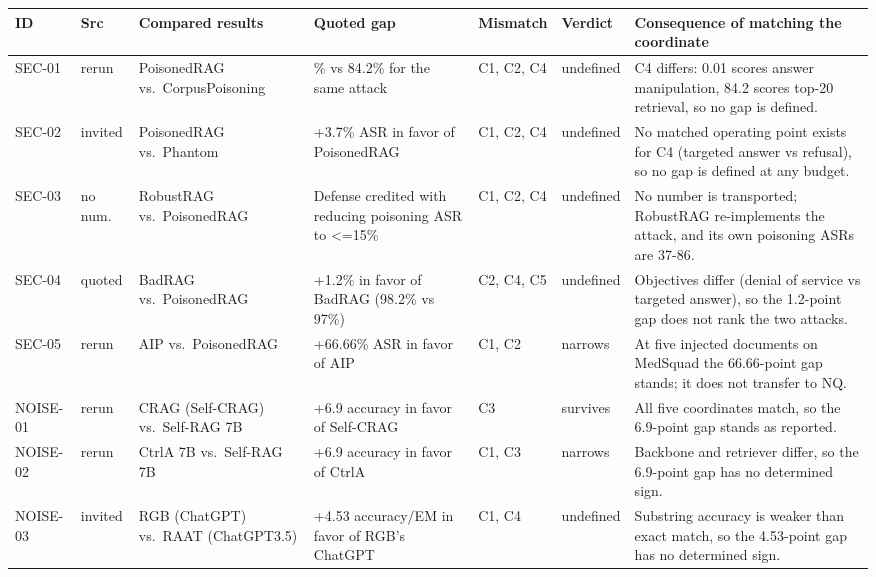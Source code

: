 \begin{table}[t]
\centering\scriptsize
\setlength{\tabcolsep}{2pt}
\begin{tabular}{@{}>{\raggedright\arraybackslash}p{}>{\raggedright\arraybackslash}p{}>{\raggedright\arraybackslash}p{}>{\raggedright\arraybackslash}p{}>{\raggedright\arraybackslash}p{}>{\raggedright\arraybackslash}p{}>{\raggedright\arraybackslash}p{}@{}}
\toprule
ID & Src & Compared results & Quoted gap & Mismatch & Verdict & Consequence of matching the coordinate \\
\midrule
SEC-01 & rerun & PoisonedRAG vs.~CorpusPoisoning & 1\% vs 84.2\% for the same attack & C1, C2, C4 & undefined & C4 differs: 0.01 scores answer manipulation, 84.2 scores top-20 retrieval, so no gap is defined. \\
SEC-02 & invited & PoisonedRAG vs.~Phantom & +3.7\% ASR in favor of PoisonedRAG & C1, C2, C4 & undefined & No matched operating point exists for C4 (targeted answer vs refusal), so no gap is defined at any budget. \\
SEC-03 & no num. & RobustRAG vs.~PoisonedRAG & Defense credited with reducing poisoning ASR to <=15\% & C1, C2, C4 & undefined & No number is transported; RobustRAG re-implements the attack, and its own poisoning ASRs are 37-86. \\
SEC-04 & quoted & BadRAG vs.~PoisonedRAG & +1.2\% in favor of BadRAG (98.2\% vs 97\%) & C2, C4, C5 & undefined & Objectives differ (denial of service vs targeted answer), so the 1.2-point gap does not rank the two attacks. \\
SEC-05 & rerun & AIP vs.~PoisonedRAG & +66.66\% ASR in favor of AIP & C1, C2 & narrows & At five injected documents on MedSquad the 66.66-point gap stands; it does not transfer to NQ. \\
NOISE-01 & rerun & CRAG (Self-CRAG) vs.~Self-RAG 7B & +6.9 accuracy in favor of Self-CRAG & C3 & survives & All five coordinates match, so the 6.9-point gap stands as reported. \\
NOISE-02 & rerun & CtrlA 7B vs.~Self-RAG 7B & +6.9 accuracy in favor of CtrlA & C1, C3 & narrows & Backbone and retriever differ, so the 6.9-point gap has no determined sign. \\
NOISE-03 & invited & RGB (ChatGPT) vs.~RAAT (ChatGPT3.5) & +4.53 accuracy/EM in favor of RGB's ChatGPT & C1, C4 & undefined & Substring accuracy is weaker than exact match, so the 4.53-point gap has no determined sign. \\

\end{tabular}
\end{table}
